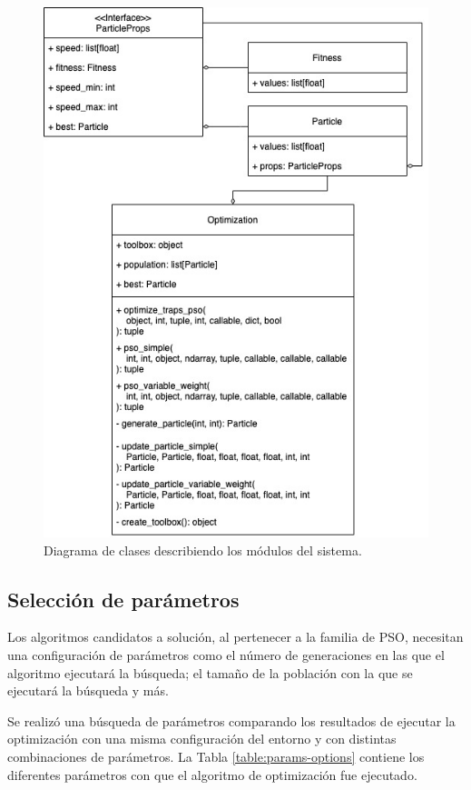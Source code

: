 \documentclass[letterpaper]{report}
\begin{document}
    \begin{figure}[ht!]
      \includegraphics[width=\textwidth]{optimization-modules.jpeg}
      \caption{Diagrama de clases describiendo los módulos del sistema.}
      \label{fig:optimization-modules}
    \end{figure}

    \subsection{Selección de parámetros}

    Los algoritmos candidatos a solución, al pertenecer a la familia de PSO,
    necesitan una configuración de parámetros como el número de generaciones en
    las que el algoritmo ejecutará la búsqueda; el tamaño de la población con la
    que se ejecutará la búsqueda y más.

    Se realizó una búsqueda de parámetros comparando los resultados de ejecutar
    la optimización con una misma configuración del entorno y con distintas
    combinaciones de parámetros. La Tabla \ref{table:params-options} contiene
    los diferentes parámetros con que el algoritmo de optimización fue
    ejecutado.
\end{document}
